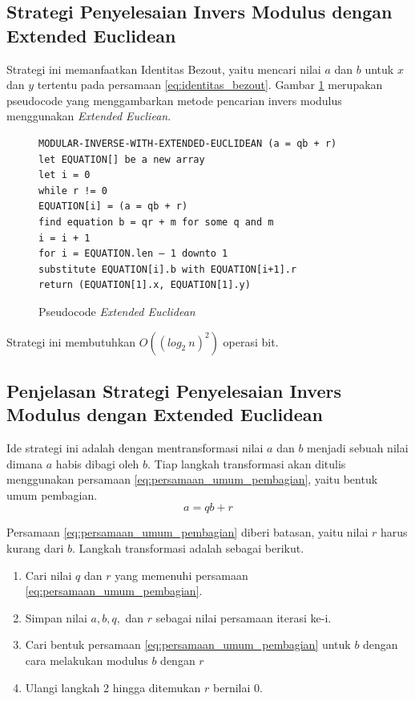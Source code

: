 \subsection {Strategi Penyelesaian Invers Modulus dengan Extended Euclidean}

Strategi ini memanfaatkan Identitas Bezout, yaitu mencari nilai $ a $ dan $ b $ untuk $ x $ dan $ y $ tertentu pada persamaan \eqref{eq:identitas_bezout}. Gambar \ref{psdo:extended_euclidean} merupakan pseudocode yang menggambarkan metode pencarian invers modulus menggunakan \textit{Extended Eucliean}.

\begin{figure}[h!]
\begin{lstlisting}[firstnumber=0]
MODULAR-INVERSE-WITH-EXTENDED-EUCLIDEAN (a = qb + r)
let EQUATION[] be a new array
let i = 0
while r != 0
EQUATION[i] = (a = qb + r)
find equation b = qr + m for some q and m
i = i + 1
for i = EQUATION.len – 1 downto 1
substitute EQUATION[i].b with EQUATION[i+1].r
return (EQUATION[1].x, EQUATION[1].y)
\end{lstlisting}
\caption{Pseudocode \textit{Extended Euclidean}}
\label{psdo:extended_euclidean}
\end{figure}

Strategi ini membutuhkan $ O((log_2\ n)^2) $ operasi bit. \cite{hac_math}

\subsection{Penjelasan Strategi Penyelesaian Invers Modulus dengan Extended Euclidean}

Ide strategi ini adalah dengan mentransformasi nilai $ a $ dan $ b $ menjadi sebuah nilai dimana $ a $ habis dibagi oleh $ b $. Tiap langkah transformasi akan ditulis menggunakan persamaan \eqref{eq:persamaan_umum_pembagian}, yaitu bentuk umum pembagian.
\begin{equation*}
a=qb+r
\end{equation*}

Persamaan \eqref{eq:persamaan_umum_pembagian} diberi batasan, yaitu nilai $ r $ harus kurang dari $ b $. Langkah transformasi adalah sebagai berikut.
\begin{enumerate}
\item Cari nilai $ q $ dan $ r $ yang memenuhi persamaan \eqref{eq:persamaan_umum_pembagian}.
\item Simpan nilai $ a, b, q, $ dan $ r $ sebagai nilai persamaan iterasi ke-i.
\item Cari bentuk persamaan \eqref{eq:persamaan_umum_pembagian} untuk $ b $ dengan cara melakukan modulus $ b $ dengan $ r $
\item Ulangi langkah 2 hingga ditemukan $ r $ bernilai 0.
\end{enumerate}

